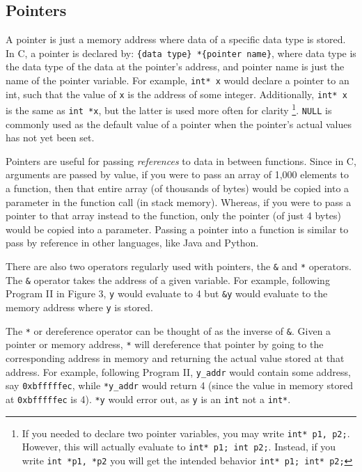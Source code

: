 \documentclass{article}
\begin{document}
\subsection{Pointers}
A pointer is just a memory address where data of a specific data type is stored. In C, a pointer is declared by: \texttt{\{data type\} *\{pointer name\}}, where data type is the data type of the data at the pointer's address, and pointer name is just the name of the pointer variable. For example, \texttt{int* x} would declare a pointer to an int, such that the value of \texttt{x} is the address of some integer. Additionally, \texttt{int* x} is the same as \texttt{int *x}, but the latter is used more often for clarity \footnote{If you needed to declare two pointer variables, you may write \texttt{int* p1, p2;}. However, this will actually evaluate to \texttt{int* p1; int p2;}. Instead, if you write \texttt{int *p1, *p2} you will get the intended behavior \texttt{int* p1; int* p2;}}. \texttt{NULL} is commonly used as the default value of a pointer when the pointer's actual values has not yet been set.

Pointers are useful for passing \textit{references} to data in between functions. Since in C, arguments are passed by value, if you were to pass an array of 1,000 elements to a function, then that entire array (of thousands of bytes) would be copied into a parameter in the function call (in stack memory). Whereas, if you were to pass a pointer to that array instead to the function, only the pointer (of just 4 bytes) would be copied into a parameter. Passing a pointer into a function is similar to pass by reference in other languages, like Java and Python.

There are also two operators regularly used with pointers, the \texttt{\&} and \texttt{*} operators. The \texttt{\&} operator takes the address of a given variable. For example, following Program II in Figure 3, \texttt{y} would evaluate to 4 but \texttt{\&y} would evaluate to the memory address where \texttt{y} is stored. 

The \texttt{*} or dereference operator can be thought of as the inverse of \texttt{\&}. Given a pointer or memory address, \texttt{*} will dereference that pointer by going to the corresponding address in memory and returning the actual value stored at that address. For example, following Program II, \texttt{y\_addr} would contain some address, say \texttt{0xbfffffec}, while \texttt{*y\_addr} would return 4 (since the value in memory stored at \texttt{0xbfffffec} is 4). \texttt{*y} would error out, as \texttt{y} is an \texttt{int} not a \texttt{int*}.
\end{document}

